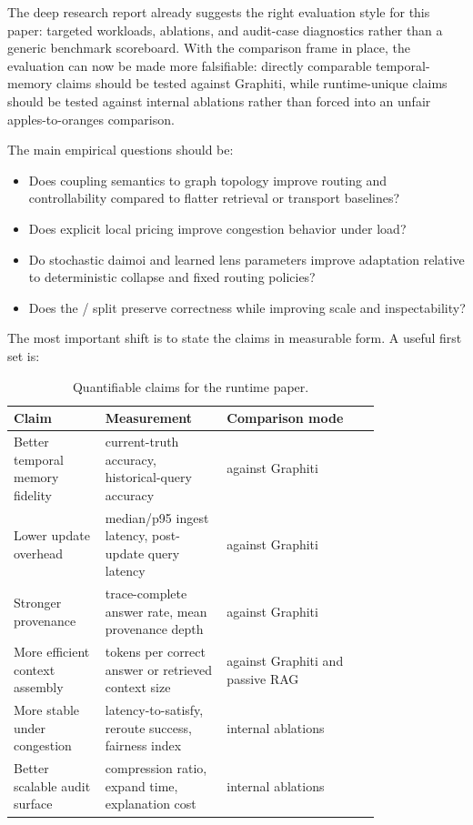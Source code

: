 The deep research report already suggests the right evaluation style for this paper: targeted workloads, ablations, and audit-case diagnostics rather than a generic benchmark scoreboard. With the comparison frame in place, the evaluation can now be made more falsifiable: directly comparable temporal-memory claims should be tested against Graphiti, while runtime-unique claims should be tested against internal ablations rather than forced into an unfair apples-to-oranges comparison.

The main empirical questions should be:

\begin{itemize}[leftmargin=1.5em]
  \item Does coupling semantics to graph topology improve routing and controllability compared to flatter retrieval or transport baselines?
  \item Does explicit local pricing improve congestion behavior under load?
  \item Do stochastic daimoi and learned lens parameters improve adaptation relative to deterministic collapse and fixed routing policies?
  \item Does the \truthgraph{}/\viewgraph{} split preserve correctness while improving scale and inspectability?
\end{itemize}

The most important shift is to state the claims in measurable form. A useful first set is:

\begin{table}[t]
\centering
\small
\begin{tabular}{p{0.2\linewidth}p{0.26\linewidth}p{0.34\linewidth}}
\toprule
Claim & Measurement & Comparison mode \\
\midrule
Better temporal memory fidelity & current-truth accuracy, historical-query accuracy & against Graphiti \\
Lower update overhead & median/p95 ingest latency, post-update query latency & against Graphiti \\
Stronger provenance & trace-complete answer rate, mean provenance depth & against Graphiti \\
More efficient context assembly & tokens per correct answer or retrieved context size & against Graphiti and passive RAG \\
More stable under congestion & latency-to-satisfy, reroute success, fairness index & internal ablations \\
Better scalable audit surface & compression ratio, expand time, explanation cost & internal ablations \\
\bottomrule
\end{tabular}
\caption{Quantifiable claims for the runtime paper.}
\end{table}

